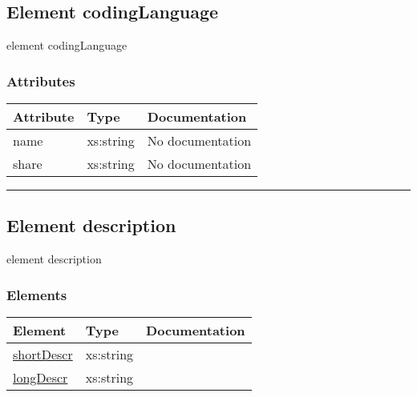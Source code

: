 \documentclass[
]{article}
\begin{document}
\protect\hypertarget{element_codingLanguage}{}{}

\hypertarget{element-codinglanguage}{%
\subsection{\texorpdfstring{Element { codingLanguage
}}{Element  codingLanguage }}\label{element-codinglanguage}}

{element codingLanguage}

\hypertarget{attributes-1}{%
\subsubsection{Attributes}\label{attributes-1}}

\begin{longtable}[]{@{}lll@{}}
\toprule
Attribute & Type & Documentation \\
\midrule
\endhead
name & xs:string & No documentation \\
share & xs:string & No documentation \\
\bottomrule
\end{longtable}

\begin{center}\rule{0.5\linewidth}{0.5pt}\end{center}

\protect\hypertarget{element_description}{}{}

\hypertarget{element-description}{%
\subsection{\texorpdfstring{Element { description
}}{Element  description }}\label{element-description}}

{element description}

\hypertarget{elements-1}{%
\subsubsection{Elements}\label{elements-1}}

\begin{longtable}[]{@{}lll@{}}
\toprule
Element & Type & Documentation \\
\midrule
\endhead
\protect\hyperlink{element_shortDescr}{shortDescr} & xs:string & \\
\protect\hyperlink{element_longDescr}{longDescr} & xs:string & \\
\bottomrule
\end{longtable}
\end{document}
